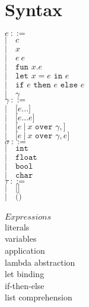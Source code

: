 \documentclass[5pt]{article}
\begin{document}
\section{Syntax}
\begin{multicols}{2}
\noindent $e \ ::= $ \\
\hspace*{10mm} $| \quad c$ \\
\hspace*{10mm} $| \quad x$ \\
\hspace*{10mm} $| \quad e \ e$ \\
\hspace*{10mm} $| \quad \texttt{fun } x . e$ \\
\hspace*{10mm} $| \quad \texttt{let }x = e \texttt{ in } e$ \\
\hspace*{10mm} $| \quad \texttt{if } e \texttt{ then } e \texttt{ else } e$ \\
\hspace*{10mm} $| \quad \gamma$ \\

\noindent $\gamma \ ::= $ \\
\hspace*{10mm} $| \quad \texttt{[}e...\texttt{]}$ \\
\hspace*{10mm} $| \quad \texttt{[}e...e\texttt{]}$ \\
\hspace*{10mm} $| \quad \texttt{[}e \ | \ x \texttt{ over } \gamma, \texttt{]}$ \\
\hspace*{10mm} $| \quad \texttt{[}e \ | \ x \texttt{ over } \gamma, e \texttt{]}$ \\

\noindent $\sigma \ ::= $ \\
\hspace*{10mm} $| \quad \texttt{int}$ \\
\hspace*{10mm} $| \quad \texttt{float}$ \\
\hspace*{10mm} $| \quad \texttt{bool}$ \\
\hspace*{10mm} $| \quad \texttt{char}$ \\

\noindent $\tau \ ::= $ \\
\hspace*{10mm} $| \quad \texttt{[]} $ \\
\hspace*{10mm} $| \quad \texttt{()} $ \\
\columnbreak \\
$Expressions$ \\
literals \\
variables \\
application \\
lambda abstraction \\
let binding \\
if-then-else \\
list comprehension \\


\end{multicols}
\end{document}
